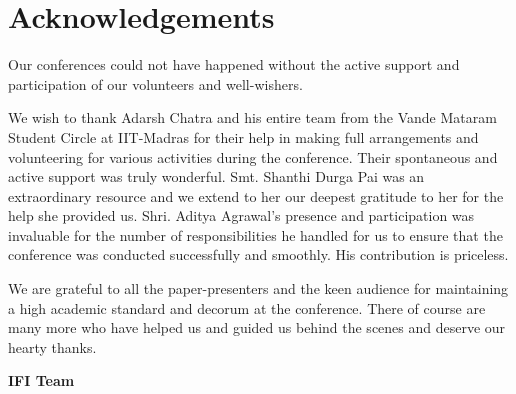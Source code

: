 
\chapter*{Acknowledgements}\label{ack}

Our conferences could not have happened without the active support and participation of our volunteers and well-wishers.

We wish to thank Adarsh Chatra and his entire team from the Vande Mataram Student Circle at IIT-Madras for their help in making full arrangements and volunteering for various activities during the conference. Their spontaneous and active support was truly wonderful. Smt. Shanthi Durga Pai was an extraordinary resource and we extend to her our deepest gratitude to her for the help she provided us. Shri. Aditya Agrawal’s presence and participation was invaluable for the number of responsibilities he handled for us to ensure that the conference was conducted successfully and smoothly. His contribution is priceless.

We are grateful to all the paper-presenters and the keen audience for maintaining a high academic standard and decorum at the conference. There of course are many more who have helped us and guided us behind the scenes and deserve our hearty thanks.

\begin{flushright}
 \textbf{IFI Team}
\end{flushright}

